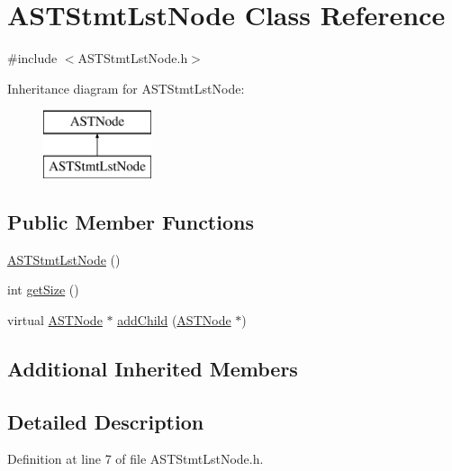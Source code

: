 \hypertarget{class_a_s_t_stmt_lst_node}{\section{A\-S\-T\-Stmt\-Lst\-Node Class Reference}
\label{class_a_s_t_stmt_lst_node}
}


{\ttfamily \#include $<$A\-S\-T\-Stmt\-Lst\-Node.\-h$>$}

Inheritance diagram for A\-S\-T\-Stmt\-Lst\-Node\-:\begin{figure}[H]
\begin{center}
\leavevmode
\includegraphics[height=2.000000cm]{class_a_s_t_stmt_lst_node}
\end{center}
\end{figure}
\subsection*{Public Member Functions}
\begin{DoxyCompactItemize}
\item 
\hyperlink{class_a_s_t_stmt_lst_node_a12c10755015930be83b22f9edd75f610}{A\-S\-T\-Stmt\-Lst\-Node} ()
\item 
int \hyperlink{class_a_s_t_stmt_lst_node_a49f21aa9b4b7836943762aee8f5ffae0}{get\-Size} ()
\item 
virtual \hyperlink{class_a_s_t_node}{A\-S\-T\-Node} $\ast$ \hyperlink{class_a_s_t_stmt_lst_node_a5424fe2ed759c533a1c26e6172dae45f}{add\-Child} (\hyperlink{class_a_s_t_node}{A\-S\-T\-Node} $\ast$)
\end{DoxyCompactItemize}
\subsection*{Additional Inherited Members}


\subsection{Detailed Description}


Definition at line 7 of file A\-S\-T\-Stmt\-Lst\-Node.\-h.



